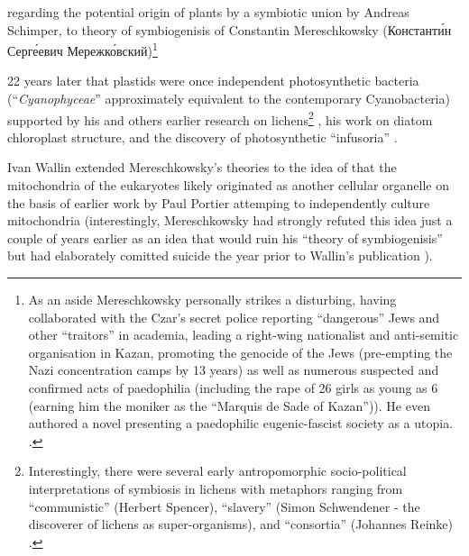 regarding the potential origin of plants by a symbiotic union by Andreas Schimper, 
to theory of symbiogenisis of Constantin Mereschkowsky (Константи́н Серге́евич Мережко́вский)\footnote{As 
    an aside Mereschkowsky personally strikes a disturbing, having
    collaborated with the Czar's secret police reporting ``dangerous''
    Jews and other ``traitors'' in academia, leading a right-wing nationalist
    and anti-semitic organisation in Kazan, promoting the genocide of the Jews
    (pre-empting the Nazi concentration camps by 13 years) as well as numerous suspected and 
    confirmed acts of paedophilia (including the rape of 26 girls as young as 6 
    (earning him the moniker as the ``Marquis de Sade of Kazan'')).  
    He even authored a novel presenting a paedophilic eugenic-fascist
    society as a utopia.  
    \citep{Sapp2002}.}

22 years later that plastids were once independent photosynthetic bacteria 
(``\textit{Cyanophyceae}'' approximately equivalent to the contemporary Cyanobacteria) 
supported by his and others earlier research on lichens\footnote{Interestingly, 
    there were several early antropomorphic socio-political 
    interpretations of symbiosis in lichens with metaphors ranging from ``communistic'' 
    (Herbert Spencer), ``slavery'' (Simon Schwendener - the discoverer of lichens as
    super-organisms), and ``consortia'' (Johannes Reinke) \citep{Sapp2002}.}
, his work on diatom chloroplast structure, and the discovery of 
photosynthetic ``infusoria'' \citep{Mereschkowsky1905,Martin1999a,Sapp2002}. 

Ivan Wallin extended Mereschkowsky's theories to the idea of that the mitochondria
of the eukaryotes likely originated as another cellular organelle \citep{Wallin1922} 
on the basis of earlier work by Paul Portier attemping to independently
culture mitochondria \citep{Sapp2002} (interestingly, 
Mereschkowsky had strongly refuted this idea just a couple of years earlier as 
an idea that would ruin his ``theory of symbiogenisis'' \citep{Sapp2002} but 
had elaborately comitted suicide the year prior to Wallin's publication \citep{Sapp200}).

